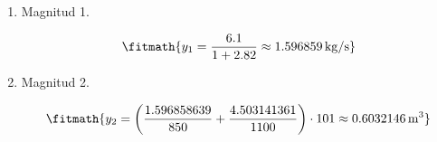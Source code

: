 \begin{enumerate}

\item Magnitud 1.

\[\fitmath{y_{1}=\frac{6.1}{1+2.82}\approx 1.596859\,\mathrm{kg/s}}\]

\item Magnitud 2.

\[\fitmath{y_{2}=\left(\frac{1.596858639}{850}+\frac{4.503141361}{1100}\right)\cdot 101\approx 0.6032146\,\mathrm{m^{3}}}\]

\end{enumerate}
